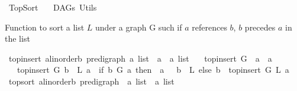 %
\begin{isabellebody}%
%
%
\isadelimtheory
%
\endisadelimtheory
%
\isatagtheory
{}\isamarkupfalse%
\ TopSort\isanewline
\ \ \ DAGs\ Utils\isanewline
{}%
\endisatagtheory
{\isafoldtheory}%
%
\isadelimtheory
%
\endisadelimtheory
%
\begin{isamarkuptext}%
Function to sort a list $L$ under a graph G such if $a$ references $b$,
$b$ precedes $a$ in the list%
\end{isamarkuptext}\isamarkuptrue%
\isamarkupfalse%
\ top{\isacharunderscore}{\kern0pt}insert{\isacharcolon}{\kern0pt}{\isacharcolon}{\kern0pt}\ {\isachardoublequoteopen}{\isacharparenleft}{\kern0pt}{\isacharprime}{\kern0pt}a{\isacharcolon}{\kern0pt}{\isacharcolon}{\kern0pt}linorder{\isacharcomma}{\kern0pt}{\isacharprime}{\kern0pt}b{\isacharparenright}{\kern0pt}\ pre{\isacharunderscore}{\kern0pt}digraph\ {\isasymRightarrow}{\isacharprime}{\kern0pt}a\ list\ {\isasymRightarrow}\ {\isacharprime}{\kern0pt}a\ {\isasymRightarrow}\ {\isacharprime}{\kern0pt}a\ list{\isachardoublequoteclose}\isanewline
\ \ \ {\isachardoublequoteopen}top{\isacharunderscore}{\kern0pt}insert\ G\ {\isacharbrackleft}{\kern0pt}{\isacharbrackright}{\kern0pt}\ a\ {\isacharequal}{\kern0pt}\ {\isacharbrackleft}{\kern0pt}a{\isacharbrackright}{\kern0pt}{\isachardoublequoteclose}\isanewline
\ \ {\isacharbar}{\kern0pt}\ {\isachardoublequoteopen}top{\isacharunderscore}{\kern0pt}insert\ G\ {\isacharparenleft}{\kern0pt}b\ {\isacharhash}{\kern0pt}\ L{\isacharparenright}{\kern0pt}\ a\ {\isacharequal}{\kern0pt}\ {\isacharparenleft}{\kern0pt}if\ {\isacharparenleft}{\kern0pt}b\ {\isasymrightarrow}\isactrlsup {\isacharplus}{\kern0pt}\isactrlbsub G\isactrlesub \ a{\isacharparenright}{\kern0pt}\ then\ \ {\isacharparenleft}{\kern0pt}a\ {\isacharhash}{\kern0pt}\ {\isacharparenleft}{\kern0pt}\ b\ {\isacharhash}{\kern0pt}\ L{\isacharparenright}{\kern0pt}{\isacharparenright}{\kern0pt}\ else\ {\isacharparenleft}{\kern0pt}b\ {\isacharhash}{\kern0pt}\ top{\isacharunderscore}{\kern0pt}insert\ G\ L\ a{\isacharparenright}{\kern0pt}{\isacharparenright}{\kern0pt}{\isachardoublequoteclose}\isanewline
\isanewline
{}\isamarkupfalse%
\ top{\isacharunderscore}{\kern0pt}sort{\isacharcolon}{\kern0pt}{\isacharcolon}{\kern0pt}\ {\isachardoublequoteopen}{\isacharparenleft}{\kern0pt}{\isacharprime}{\kern0pt}a{\isacharcolon}{\kern0pt}{\isacharcolon}{\kern0pt}linorder{\isacharcomma}{\kern0pt}{\isacharprime}{\kern0pt}b{\isacharparenright}{\kern0pt}\ pre{\isacharunderscore}{\kern0pt}digraph\ {\isasymRightarrow}\ {\isacharprime}{\kern0pt}a\ list\ {\isasymRightarrow}\ {\isacharprime}{\kern0pt}a\ list{\isachardoublequoteclose}\isanewline

\end{isabellebody}

